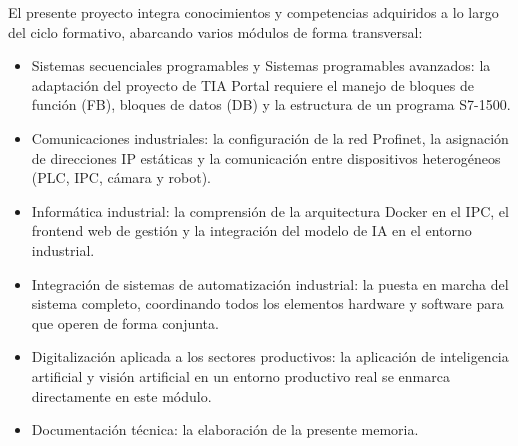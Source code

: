 
El presente proyecto integra conocimientos y competencias adquiridos a lo largo del ciclo formativo, abarcando varios módulos de forma transversal:

\begin{itemize}
	\item Sistemas secuenciales programables y Sistemas programables avanzados: la adaptación del proyecto de TIA Portal requiere el manejo de bloques de función (FB), bloques de datos (DB) y la estructura de un programa S7-1500.

	\item Comunicaciones industriales: la configuración de la red Profinet, la asignación de direcciones IP estáticas y la comunicación entre dispositivos heterogéneos (PLC, IPC, cámara y robot).

	\item Informática industrial: la comprensión de la arquitectura Docker en el IPC, el frontend web de gestión y la integración del modelo de IA en el entorno industrial.

	\item Integración de sistemas de automatización industrial: la puesta en marcha del sistema completo, coordinando todos los elementos hardware y software para que operen de forma conjunta.

	\item Digitalización aplicada a los sectores productivos: la aplicación de inteligencia artificial y visión artificial en un entorno productivo real se enmarca directamente en este módulo.

	\item Documentación técnica: la elaboración de la presente memoria.
\end{itemize}


